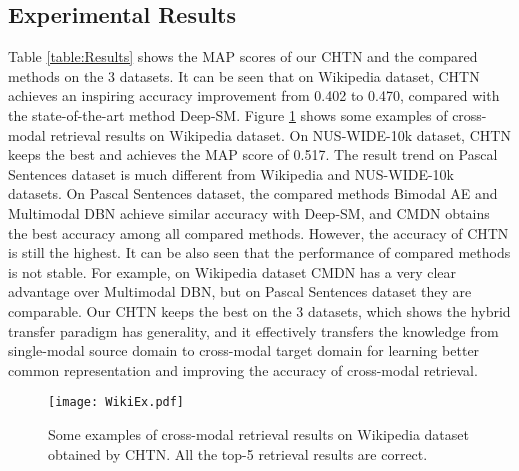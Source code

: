 \documentclass{article}
\begin{document}
\subsection{Experimental Results}
Table \ref{table:Results} shows the MAP scores of our CHTN and the compared methods on the 3 datasets. It can be seen that on Wikipedia dataset, CHTN achieves an inspiring accuracy improvement from 0.402 to 0.470, compared with the state-of-the-art method Deep-SM. Figure \ref{fig:WikiEx} shows some examples of cross-modal retrieval results on Wikipedia dataset. On NUS-WIDE-10k dataset, CHTN keeps the best and achieves the MAP score of 0.517. The result trend on Pascal Sentences dataset is much different from Wikipedia and NUS-WIDE-10k datasets. On Pascal Sentences dataset, the compared methods Bimodal AE and Multimodal DBN achieve similar accuracy with Deep-SM, and CMDN obtains the best accuracy among all compared methods. However, the accuracy of CHTN is still the highest. 
It can be also seen that the performance of compared methods is not stable.
For example, on Wikipedia dataset CMDN has a very clear advantage over Multimodal DBN, but on Pascal Sentences dataset they are comparable. Our CHTN keeps the best on the 3 datasets, which shows the hybrid transfer paradigm has generality, and it effectively transfers the knowledge from single-modal source domain to cross-modal target domain for learning better common representation and improving the accuracy of cross-modal retrieval.

\begin{figure}[t]
  \centering
\begin{minipage}[c]{\linewidth}
\centering
  \texttt{[image: WikiEx.pdf]}
\end{minipage}%
\caption{Some examples of cross-modal retrieval results on Wikipedia dataset obtained by CHTN. All the top-5 retrieval results are correct.}\label{fig:WikiEx}


\end{figure}
\end{document}
